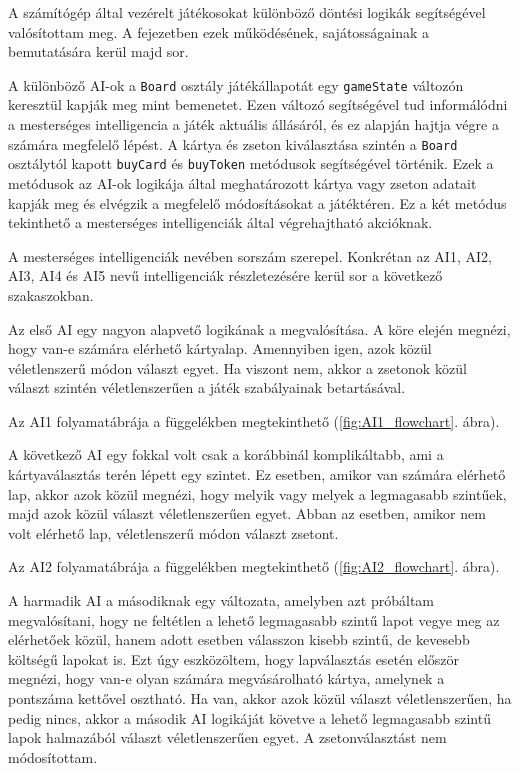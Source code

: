 
A számítógép által vezérelt játékosokat különböző döntési logikák segítségével valósítottam meg. A fejezetben ezek működésének, sajátosságainak a bemutatására kerül majd sor.

A különböző AI-ok a \texttt{Board} osztály játékállapotát egy \texttt{gameState} változón keresztül kapják meg mint bemenetet. Ezen változó segítségével tud informálódni a mesterséges intelligencia a játék aktuális állásáról, és ez alapján hajtja végre a számára megfelelő lépést. A kártya és zseton kiválasztása szintén a \texttt{Board} osztálytól kapott \texttt{buyCard} és \texttt{buyToken} metódusok segítségével történik. Ezek a metódusok az AI-ok logikája által meghatározott kártya vagy zseton adatait kapják meg és elvégzik a megfelelő módosításokat a játéktéren. Ez a két metódus tekinthető a mesterséges intelligenciák által végrehajtható akcióknak.

A mesterséges intelligenciák nevében sorszám szerepel. Konkrétan az AI1, AI2, AI3, AI4 és AI5 nevű intelligenciák részletezésére kerül sor a következő szakaszokban.


Az első AI egy nagyon alapvető logikának a megvalósítása. A köre elején megnézi, hogy van-e számára elérhető kártyalap. Amennyiben igen, azok közül véletlenszerű módon választ egyet. Ha viszont nem, akkor a zsetonok közül választ szintén véletlenszerűen a játék szabályainak betartásával.

Az AI1 folyamatábrája a függelékben megtekinthető (\ref{fig:AI1_flowchart}. ábra).



A következő AI egy fokkal volt csak a korábbinál komplikáltabb, ami a kártyaválasztás terén lépett egy szintet. Ez esetben, amikor van számára elérhető lap, akkor azok közül megnézi, hogy melyik vagy melyek a legmagasabb szintűek, majd azok közül választ véletlenszerűen egyet. Abban az esetben, amikor nem volt elérhető lap, véletlenszerű módon választ zsetont.

Az AI2 folyamatábrája a függelékben megtekinthető (\ref{fig:AI2_flowchart}. ábra).



A harmadik AI a másodiknak egy változata, amelyben azt próbáltam megvalósítani, hogy ne feltétlen a lehető legmagasabb szintű lapot vegye meg az elérhetőek közül, hanem adott esetben válasszon kisebb szintű, de kevesebb költségű lapokat is. Ezt úgy eszközöltem, hogy lapválasztás esetén először megnézi, hogy van-e olyan számára megvásárolható kártya, amelynek a pontszáma kettővel osztható. Ha van, akkor azok közül választ véletlenszerűen, ha pedig nincs, akkor a második AI logikáját követve a lehető legmagasabb szintű lapok halmazából választ véletlenszerűen egyet. A zsetonválasztást nem módosítottam.

